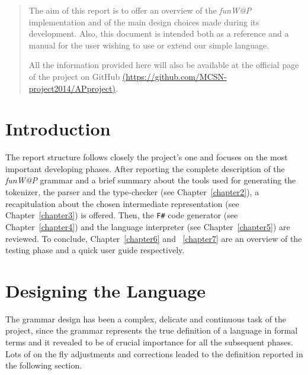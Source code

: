 \documentclass[]{final_report}
\begin{document}
\maketitle
\tableofcontents{}\newpage


\begin{abstract}

The aim of this report is to offer an overview of the \textit{funW@P} implementation and of the main design choices made during its development. Also, this document is intended both as a reference and a manual for the user wishing to use or extend our simple language. 

All the information provided here will also be available at the official page of the project on GitHub \href{https://github.com/MCSN-project2014/APproject}{(https://github.com/MCSN-project2014/APproject)}.

\end{abstract}
\newpage



\chapter{Introduction}

The report structure follows closely the project's one and focuses on the most important developing phases. After reporting the complete description of the \textit{funW@P} grammar and a brief summary about the tools used for generating the tokenizer, the parser and the type-checker (see Chapter~\ref{chapter2}), a recapitulation about the chosen intermediate representation (see Chapter~\ref{chapter3}) is offered. Then, the \texttt{F\#} code generator (see Chapter~\ref{chapter4}) and the language interpreter (see Chapter~\ref{chapter5}) are reviewed. To conclude, Chapter~\ref{chapter6} and ~\ref{chapter7} are an overview of the testing phase and a quick user guide respectively.

\chapter{\label{chapter2} Designing the Language}

The grammar design has been a complex, delicate and continuous task of the project, since the grammar represents the true definition of a language in formal terms and it revealed to be of crucial importance for all the subsequent phases. Lots of on the fly adjustments and corrections leaded to the definition reported in the following section.
\end{document}
